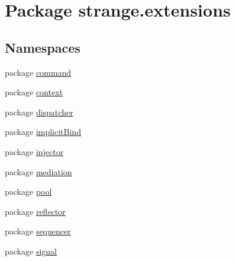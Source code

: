 \hypertarget{namespacestrange_1_1extensions}{\section{Package strange.\-extensions}
\label{namespacestrange_1_1extensions}
}
\subsection*{Namespaces}
\begin{DoxyCompactItemize}
\item 
package \hyperlink{namespacestrange_1_1extensions_1_1command}{command}
\item 
package \hyperlink{namespacestrange_1_1extensions_1_1context}{context}
\item 
package \hyperlink{namespacestrange_1_1extensions_1_1dispatcher}{dispatcher}
\item 
package \hyperlink{namespacestrange_1_1extensions_1_1implicit_bind}{implicit\-Bind}
\item 
package \hyperlink{namespacestrange_1_1extensions_1_1injector}{injector}
\item 
package \hyperlink{namespacestrange_1_1extensions_1_1mediation}{mediation}
\item 
package \hyperlink{namespacestrange_1_1extensions_1_1pool}{pool}
\item 
package \hyperlink{namespacestrange_1_1extensions_1_1reflector}{reflector}
\item 
package \hyperlink{namespacestrange_1_1extensions_1_1sequencer}{sequencer}
\item 
package \hyperlink{namespacestrange_1_1extensions_1_1signal}{signal}
\end{DoxyCompactItemize}

